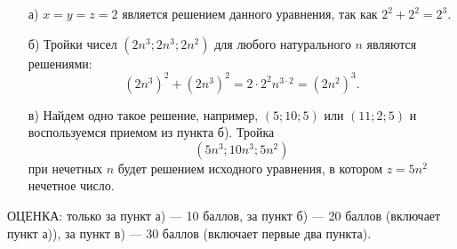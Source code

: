 \solutionSection
\begin{enumerate}
    \item [а)] $x=y=z=2$ является решением данного уравнения, так как $2^{2}+2^{2}=2^{3}$.

    \item [б)]  Тройки чисел $(2n^{3};2n^{3};2n^{2})$ для любого натурального $n$ являются решениями: $$(2n^{3})^{2}+(2n^{3})^{2}=2\cdot2^{2}n^{3\cdot2}=(2n^{2})^{3}.$$

    \item [в)] Найдем одно такое решение, например, $(5;10;5)$ или $(11;2;5)$ и воспользуемся приемом из пункта б). Тройка 
$$
(5n^3;10n^3;5n^2)
$$
при нечетных $n$ будет решением исходного уравнения, в котором $z=5n^2$ нечетное число.
\end{enumerate}

\additionalCriteria 
ОЦЕНКА: только за пункт а) --- 10 баллов, за пункт б) --- 20 баллов (включает пункт а)), за пункт в) --- 30 баллов (включает первые два пункта).


